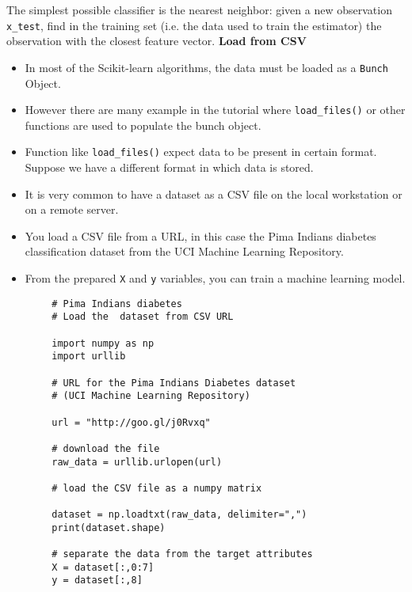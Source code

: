 \documentclass[SKL-MASTER.tex]{subfiles}
\begin{document}
The simplest possible classifier is the nearest neighbor: given a new observation \texttt{x\_test}, find in the training set (i.e. the data used to train the estimator) the observation with the closest feature vector.
\newpage
	\noindent \textbf{Load from CSV}\\ \begin{itemize}
\item In most of the Scikit-learn algorithms, the data must be loaded as a \texttt{Bunch} Object. 
\item However there are many example in the tutorial where \texttt{load\_files()} or other functions are used to populate the bunch object. 
\item Function like \texttt{load\_files()} expect data to be present in certain format. Suppose we have a different format in which data is stored.
\item It is very common to have a dataset as a CSV file on the local workstation or on a remote server.

\item You load a CSV file from a URL, in this case the Pima Indians diabetes classification dataset from the UCI Machine Learning Repository.

\item From the prepared \texttt{X} and \texttt{y} variables, you can train a machine learning model.
	\end{itemize}

	
	\newpage
	
	\begin{framed}
		\begin{verbatim}
		# Pima Indians diabetes
		# Load the  dataset from CSV URL

		import numpy as np
		import urllib
		
		# URL for the Pima Indians Diabetes dataset 
		# (UCI Machine Learning Repository)

		url = "http://goo.gl/j0Rvxq"
		
		# download the file
		raw_data = urllib.urlopen(url)
		
		# load the CSV file as a numpy matrix

		dataset = np.loadtxt(raw_data, delimiter=",")
		print(dataset.shape)
		
		# separate the data from the target attributes
		X = dataset[:,0:7]
		y = dataset[:,8]
		
		\end{verbatim}
	\end{framed}
	
\end{document}
